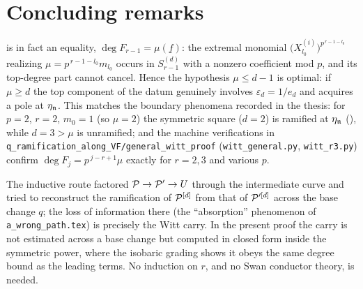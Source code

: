 \documentclass[11pt]{article}
\providecommand{\eps}{\varepsilon}                  %
\newcommand{\wv}[1]{\underline{#1}}                 %
\begin{document}
\section*{Concluding remarks}

\begin{rem*}
 is in fact an equality,
$\deg F_{r-1}=\mu(\wv f)$: the extremal monomial
$\big(X^{(i)}_{l_0}\big)^{p^{\,r-1-l_0}}$ realizing
$\mu=p^{\,r-1-l_0}m_{l_0}$ occurs in $S^{(d)}_{r-1}$ with a nonzero
coefficient mod $p$, and its top-degree part cannot cancel.  Hence the
hypothesis $\mu\le d-1$ is optimal:
if $\mu\ge d$ the top component of the datum genuinely involves
$\eps_d=1/e_d$ and acquires a pole at $\eta_{\mathfrak{n}}$.  This matches the
boundary phenomena recorded in the thesis:
for $p=2$, $r=2$, $m_0=1$ (so $\mu=2$) the symmetric square ($d=2$) is
ramified at $\eta_{\mathfrak{n}}$ (), while $d=3>\mu$ is
unramified; and the machine verifications in
\texttt{q\_ramification\_along\_VF/general\_witt\_proof}
(\texttt{witt\_general.py}, \texttt{witt\_r3.py}) confirm
$\deg F_j=p^{\,j-r+1}\mu$ exactly for $r=2,3$ and various $p$.
\end{rem*}

\begin{rem*}
The inductive route factored $\mathcal{P}\to\mathcal{P}'\to U$ through the intermediate
curve and tried to reconstruct the ramification of $\mathcal{P}^{[d]}$ from that
of $\mathcal{P}'^{[d]}$ across the base change $q$; the loss of information there
(the ``absorption'' phenomenon of \texttt{a\_wrong\_path.tex}) is
precisely the Witt carry.  In the present proof the carry is not
estimated across a base change but computed in closed form inside the
symmetric power, where the isobaric grading shows it obeys the same
degree bound as the leading terms.  No induction on $r$, and no Swan
conductor theory, is needed.
\end{rem*}
\end{document}

